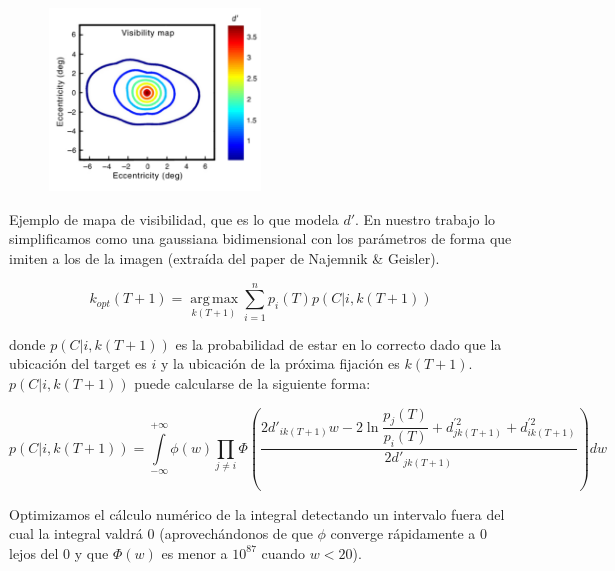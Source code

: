 \documentclass[compress]{beamer}
\DeclareMathOperator*{\argmax}{arg\,max}
\begin{document}
\begin{frame}

\begin{figure}
\begin{center}
\includegraphics[width=0.5\textwidth]{images/visibility-map.png} 
\end{center}
\end{figure}

Ejemplo de mapa de visibilidad, que es lo que modela $d'$. En nuestro trabajo lo simplificamos como una gaussiana bidimensional con los parámetros de forma que imiten a los de la imagen (extraída del paper de Najemnik \& Geisler).%

\end{frame}

\begin{frame}

$$k_{opt}(T+1) = \argmax\limits_{k(T+1)} \sum_{i=1}^n p_i(T)p(C|i,k(T+1))$$

donde $p(C|i,k(T+1))$ es la probabilidad de estar en lo correcto dado que la ubicación del target es $i$ y la ubicación de la próxima fijación es $k(T+1)$. $p(C|i,k(T+1))$ puede calcularse de la siguiente forma:
\end{frame}

\begin{frame}


{\footnotesize
$$p(C | i, k(T+1)) = \int\limits_{-\infty}^{+\infty}\phi(w) \prod\limits_{j \neq i} \Phi\left(\dfrac{2d'_{ik(T+1)} w -2\ln\dfrac{p_j(T)}{p_i(T)} + d_{jk(T+1)}^{\prime 2} + d_{ik(T+1)}^{\prime 2}}{2d'_{jk(T+1)}} \right) dw$$}

Optimizamos el cálculo numérico de la integral detectando un intervalo fuera del cual la integral valdrá 0 (aprovechándonos de que $\phi$ converge rápidamente a 0 lejos del 0 y que $\Phi(w)$ es menor a $10^{87}$ cuando $w < 20$).
\end{frame}
\end{document}

